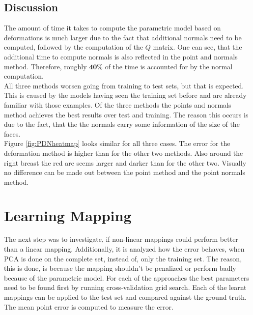 \subsection{Discussion}
The amount of time it takes to compute the parametric model based on deformations is much larger due to the fact that additional normals need to be computed, followed by the computation of the $Q$ matrix. One can see, that the additional time to compute normals is also reflected in the point and normals method. Therefore, roughly $\mathbf{40\%}$ of the time is accounted for by the normal computation.\\
All three methods worsen going from training to test sets, but that is expected. This is caused by the models having seen the training set before and are already familiar with those examples. Of the three methods the points and normals method achieves the best results over test and training. The reason this occurs is due to the fact, that the the normals carry some information of the size of the faces.\\
Figure \ref{fig:PDNheatmap} looks similar for all three cases. The error for the deformation method is higher than for the other two methods. Also around the right breast the red are seems larger and darker than for the other two. Visually no difference can be made out between the point method and the point normals method.

\section{Learning Mapping}
The next step was to investigate, if non-linear mappings could perform better than a linear mapping. Additionally, it is analyzed how the error behaves, when PCA is done on the complete set, instead of, only the training set. The reason, this is done, is because the mapping shouldn't be penalized or perform badly because of the parametric model. For each of the approaches the best parameters need to be found first by running cross-validation grid search. Each of the learnt mappings can be applied to the test set and compared against the ground truth. The mean point error is computed to measure the error.


